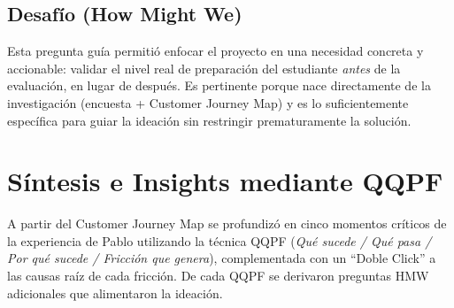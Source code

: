 \documentclass[11pt,a4paper]{article}
\begin{document}
\subsection{Desaf\'io (How Might We)}

\begin{center}
\end{center}

Esta pregunta gu\'ia permiti\'o enfocar el proyecto en una necesidad concreta y accionable: validar el nivel real de preparaci\'on del estudiante \emph{antes} de la evaluaci\'on, en lugar de despu\'es. Es pertinente porque nace directamente de la investigaci\'on (encuesta + Customer Journey Map) y es lo suficientemente espec\'ifica para guiar la ideaci\'on sin restringir prematuramente la soluci\'on.

\section{S\'intesis e Insights mediante QQPF}

A partir del Customer Journey Map se profundiz\'o en cinco momentos cr\'iticos de la experiencia de Pablo utilizando la t\'ecnica QQPF (\emph{Qu\'e sucede / Qu\'e pasa / Por qu\'e sucede / Fricci\'on que genera}), complementada con un ``Doble Click'' a las causas ra\'iz de cada fricci\'on. De cada QQPF se derivaron preguntas HMW adicionales que alimentaron la ideaci\'on.
\end{document}
